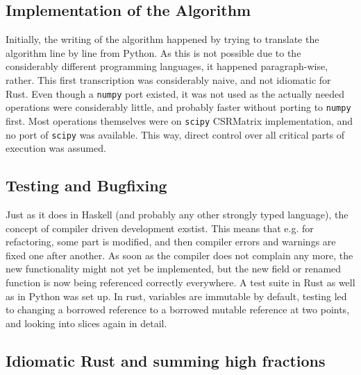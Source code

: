 \subsection{Implementation of the Algorithm}

Initially, the writing of the algorithm happened by trying to translate the
algorithm line by line from Python. As this is not possible due to the
considerably different programming languages, it happened paragraph-wise,
rather. This first transcription was considerably naive, and not idiomatic for
Rust. Even though a \verb|numpy| port existed, it was not used as the actually
needed operations were considerably little, and probably faster without porting
to \verb|numpy| first. Most operations themselves were on \verb|scipy|
CSRMatrix implementation, and no port of \verb|scipy| was available. This way,
direct control over all critical parts of execution was assumed.


\subsection{Testing and Bugfixing}

Just as it does in Haskell (and probably any other strongly typed language),
the concept of compiler driven development exstist. This means that e.g. for
refactoring, some part is modified, and then compiler errors and warnings are
fixed one after another. As soon as the compiler does not complain any more,
the new functionality might not yet be implemented, but the new field or
renamed function is now being referenced correctly everywhere. A test suite in
Rust as well as in Python was set up. In rust, variables are immutable by
default, testing led to changing a borrowed reference to a borrowed mutable
reference at two points, and looking into slices again in detail.


\subsection{Idiomatic Rust and summing high fractions}



